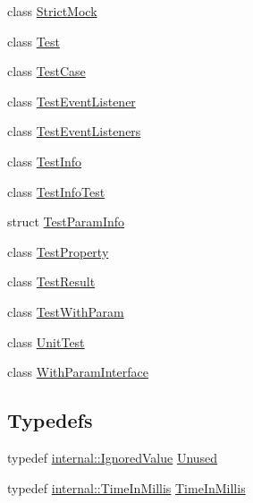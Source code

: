 \begin{DoxyCompactItemize}
class \mbox{\hyperlink{classtesting_1_1StrictMock}{Strict\+Mock}}
\item 
class \mbox{\hyperlink{classtesting_1_1Test}{Test}}
\item 
class \mbox{\hyperlink{classtesting_1_1TestCase}{Test\+Case}}
\item 
class \mbox{\hyperlink{classtesting_1_1TestEventListener}{Test\+Event\+Listener}}
\item 
class \mbox{\hyperlink{classtesting_1_1TestEventListeners}{Test\+Event\+Listeners}}
\item 
class \mbox{\hyperlink{classtesting_1_1TestInfo}{Test\+Info}}
\item 
class \mbox{\hyperlink{classtesting_1_1TestInfoTest}{Test\+Info\+Test}}
\item 
struct \mbox{\hyperlink{structtesting_1_1TestParamInfo}{Test\+Param\+Info}}
\item 
class \mbox{\hyperlink{classtesting_1_1TestProperty}{Test\+Property}}
\item 
class \mbox{\hyperlink{classtesting_1_1TestResult}{Test\+Result}}
\item 
class \mbox{\hyperlink{classtesting_1_1TestWithParam}{Test\+With\+Param}}
\item 
class \mbox{\hyperlink{classtesting_1_1UnitTest}{Unit\+Test}}
\item 
class \mbox{\hyperlink{classtesting_1_1WithParamInterface}{With\+Param\+Interface}}
\end{DoxyCompactItemize}
\subsection*{Typedefs}
\begin{DoxyCompactItemize}
\item 
typedef \mbox{\hyperlink{classtesting_1_1internal_1_1IgnoredValue}{internal\+::\+Ignored\+Value}} \mbox{\hyperlink{namespacetesting_a603e329ec0263ebfcf16f712810bd511}{Unused}}
\item 
typedef \mbox{\hyperlink{namespacetesting_1_1internal_a66a845df404b38fe85c5e14a069f255a}{internal\+::\+Time\+In\+Millis}} \mbox{\hyperlink{namespacetesting_a992de1d091ce660f451d1e8b3ce30fd6}{Time\+In\+Millis}}
\end{DoxyCompactItemize}
